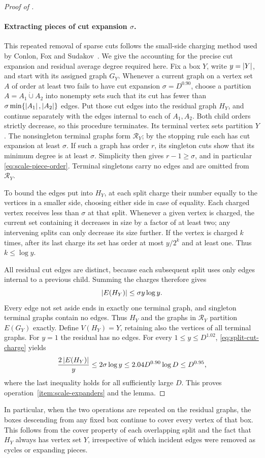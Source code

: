 \begin{proof}[Proof of ]
\paragraph{Extracting pieces of cut expansion $\sigma$.}
This repeated removal of sparse cuts follows the small-side charging
method used by Conlon, Fox and Sudakov~\cite[Lemma~3.1]{CFS2014}.
We give the accounting for the precise cut expansion and residual
average degree required here.
Fix a box $Y$, write $y=\left|Y\right|$, and start with its assigned graph
$G_Y$.  Whenever a current graph on a vertex set $A$ of order at least
two fails to have cut expansion $\sigma=D^{0.90}$, choose a partition
$A=A_1\mathbin{\dot\cup}A_2$ into nonempty sets such that its cut has
fewer than $\sigma\min\{\left|A_1\right|,\left|A_2\right|\}$ edges.  Put those
cut edges into the residual graph $H_Y$, and continue separately with
the edges internal to each of $A_1,A_2$.  Both child orders strictly
decrease, so this procedure terminates.  Its terminal vertex sets
partition $Y$.  The nonsingleton terminal graphs form
$\mathcal R_Y$; by the stopping rule each has cut expansion at least
$\sigma$.  If such a graph has order $r$, its singleton cuts show that
its minimum degree is at least $\sigma$.  Simplicity then gives
$r-1\ge\sigma$, and in particular \eqref{eq:scale-piece-order}.
Terminal singletons carry no edges and are omitted from
$\mathcal R_Y$.

To bound the edges put into $H_Y$, at each split charge their number
equally to the vertices in a smaller side, choosing either side in
case of equality.  Each charged vertex receives less than $\sigma$
at that split.  Whenever a given vertex is charged, the current set
containing it decreases in size by a factor of at least two; any
intervening splits can only decrease its size further.  If the vertex
is charged $k$ times, after its last charge its set has order at most
$y/2^k$ and at least one.  Thus $k\le\log y$.

All residual cut edges are distinct, because each subsequent split
uses only edges internal to a previous child.  Summing the charges
therefore gives
\begin{equation}\label{eq:split-cut-charge}
  \left|E(H_Y)\right|\le\sigma y\log y.
\end{equation}
Every edge not set aside ends in exactly one terminal graph, and
singleton terminal graphs contain no edges.  Thus $H_Y$ and the
graphs in $\mathcal R_Y$ partition $E(G_Y)$ exactly.  Define
$V(H_Y)=Y$, retaining also the vertices of all terminal graphs.
For $y=1$ the residual has no edges.  For every $1\le y\le D^{1.02}$,
\eqref{eq:split-cut-charge} yields
\[
  \frac{2\left|E(H_Y)\right|}{y}
    \le2\sigma\log y
    \le2.04D^{0.90}\log D
    \le D^{0.95},
\]
where the last inequality holds for all sufficiently large $D$.
This proves operation~\ref{item:scale-expanders} and the lemma.
\end{proof}

In particular, when the two operations are repeated on the residual
graphs, the boxes descending from any fixed box continue to cover
every vertex of that box.  This follows from the cover property of
each overlapping split and the fact that $H_Y$ always has vertex set
$Y$, irrespective of which incident edges were removed as cycles or
expanding pieces.
